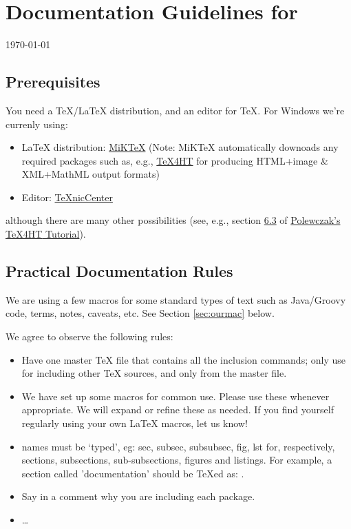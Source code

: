 


\makeindex




\chapter*{Documentation Guidelines for \PO}
\today

\section{Prerequisites}

You need a \TeX{}/\LaTeX{} distribution, and an editor for \TeX{}. For Windows we're currenly using:
\begin{itemize}
  \item \LaTeX{} distribution: \href{http://miktex.org/}{MiKTeX} (Note: MiKTeX automatically downoads
	  any required packages such as, e.g., \href{http://www.cse.ohio-state.edu/~gurari/TeX4ht/}{TeX4HT}
	  for producing HTML+image \& XML+MathML output formats)
  \item Editor: \href{http://www.texniccenter.org/}{TeXnicCenter}
\end{itemize}
although there are many other possibilities (see, e.g., section
\href{http://www.csun.edu/~hcmth008/mathml/acc_tutorial.html#x1-120006.3}{6.3} of \href{http://www.csun.edu/~hcmth008/mathml/acc_tutorial.pdf}{Polewczak's {TeX4HT} Tutorial}).

\section{Practical Documentation Rules}

We are using a few macros for some standard types of text such as Java/Groovy code, terms, notes, caveats, etc. See Section \ref{sec:ourmac} below.

We agree to observe the following rules:
\begin{itemize}
  \item Have one master \TeX{} file that contains all the inclusion commands; only use  for including other \TeX{} sources, and only from the master file.
  \item We have set up some macros for common use. Please use these whenever appropriate. We will expand or refine these as needed. If you find yourself regularly using your own LaTeX macros, let us know!
  \item {} names must be `typed', eg: sec, subsec, subsubsec, fig, lst for, respectively, sections, subsections, sub-subsections, figures and listings. For example, a section called 'documentation' should be \TeX ed as: .
  \item Say in a comment why you are including each package.
  \item \ldots
\end{itemize}

